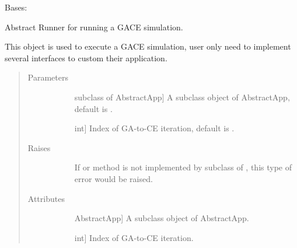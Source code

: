 \documentclass[letterpaper,10pt,english]{sphinxmanual}
\begin{document}
\begin{fulllineitems}
\label{\detokenize{pygace:pygace.gace.AbstractRunner}}
Bases: 

Abstract Runner for running a GACE simulation.

This object is used to execute a GACE simulation, user only need to
implement several interfaces to custom their application.
\begin{quote}\begin{description}
\item[{Parameters}] \leavevmode\begin{description}
\item[{}] \leavevmode{[}subclass of AbstractApp{]}
A subclass object of AbstractApp, default is .

\item[{}] \leavevmode{[}int{]}
Index of GA-to-CE iteration, default is .

\end{description}

\item[{Raises}] \leavevmode\begin{description}
\item[{}] \leavevmode
If  or  method is not implemented by subclass of
, this type of error would be raised.

\end{description}

\item[{Attributes}] \leavevmode\begin{description}
\item[{}] \leavevmode{[}AbstractApp{]}
A subclass object of AbstractApp.

\item[{}] \leavevmode{[}int{]}
Index of GA-to-CE iteration.

\end{description}

\end{description}\end{quote}


\end{fulllineitems}
\end{document}
